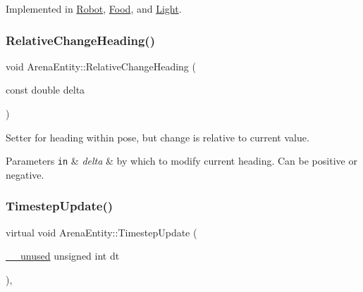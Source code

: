 Implemented in \mbox{\hyperlink{class_robot_a3f77c13705b8f60480d21d8d936dc39e}{Robot}}, \mbox{\hyperlink{class_food_a5c3bcd5109750a15ebb24b8a2a3cdd07}{Food}}, and \mbox{\hyperlink{class_light_a49b2e32cf8173353ac4689fdadbb95d5}{Light}}.

\mbox{\label{class_arena_entity_a4c4bd7f5ffb778979303c33cb3bc9986}} 
\subsubsection{\texorpdfstring{Relative\+Change\+Heading()}{RelativeChangeHeading()}}
{\footnotesize\ttfamily void Arena\+Entity\+::\+Relative\+Change\+Heading (\begin{DoxyParamCaption}\item[{const double}]{delta }\end{DoxyParamCaption})\hspace{0.3cm}{\ttfamily [inline]}}



Setter for heading within pose, but change is relative to current value. 


\begin{DoxyParams}[1]{Parameters}
\mbox{\tt in}  & {\em delta} & by which to modify current heading. Can be positive or negative. \\
\hline
\end{DoxyParams}
\mbox{\label{class_arena_entity_a203613c40a5cecf47606b2a59adcc3bd}} 
\subsubsection{\texorpdfstring{Timestep\+Update()}{TimestepUpdate()}}
{\footnotesize\ttfamily virtual void Arena\+Entity\+::\+Timestep\+Update (\begin{DoxyParamCaption}\item[{\mbox{\hyperlink{common_8h_a2e3484535ee610c8e19e9859563abe48}{\+\_\+\+\_\+unused}} unsigned int}]{dt }\end{DoxyParamCaption})\hspace{0.3cm}{\ttfamily [inline]}, {\ttfamily [virtual]}}



